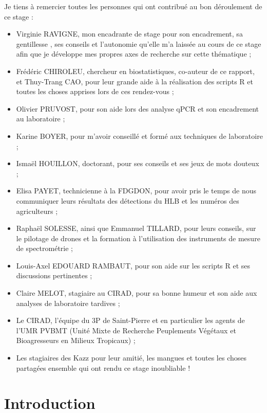 \documentclass[
  11pt,
  french,
  a4paper,
  extrafontsizes,onecolumn,openright
  ]{memoir}
\begin{document}
Je tiens à remercier toutes les personnes qui ont contribué au bon déroulement de ce stage :

\begin{itemize}
\item
  Virginie RAVIGNE, mon encadrante de stage pour son encadrement, sa gentillesse , ses conseils et l'autonomie qu'elle m'a laissée au cours de ce stage afin que je développe mes propres axes de recherche sur cette thématique ;
\item
  Frédéric CHIROLEU, chercheur en biostatistiques, co-auteur de ce rapport, et Thuy-Trang CAO, pour leur grande aide à la réalisation des scripts R et toutes les choses apprises lors de ces rendez-vous ;
\item
  Olivier PRUVOST, pour son aide lors des analyse qPCR et son encadrement au laboratoire ;
\item
  Karine BOYER, pour m'avoir conseillé et formé aux techniques de laboratoire ;
\item
  Ismaël HOUILLON, doctorant, pour ses conseils et ses jeux de mots douteux ;
\item
  Elisa PAYET, technicienne à la FDGDON, pour avoir pris le temps de nous communiquer leurs résultats des détections du HLB et les numéros des agriculteurs ;
\item
  Raphaël SOLESSE, ainsi que Emmanuel TILLARD, pour leurs conseils, sur le pilotage de drones et la formation à l'utilisation des instruments de mesure de spectrométrie ;
\item
  Louis-Axel EDOUARD RAMBAUT, pour son aide sur les scripts R et ses discussions pertinentes ;
\item
  Claire MELOT, stagiaire au CIRAD, pour sa bonne humeur et son aide aux analyses de laboratoire tardives ;
\item
  Le CIRAD, l'équipe du 3P de Saint-Pierre et en particulier les agents de l'UMR PVBMT (Unité Mixte de
  Recherche Peuplements Végétaux et Bioagresseurs en Milieux Tropicaux) ;
\item
  Les stagiaires des Kazz pour leur amitié, les mangues et toutes les choses partagées ensemble qui ont rendu ce stage inoubliable !
\end{itemize}

\scriptsize

\normalsize

\mainmatter

\hypertarget{introduction}{%
\chapter{Introduction}\label{introduction}}
\end{document}
